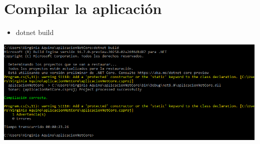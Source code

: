 \section{ Compilar la aplicación } 
\begin{itemize}
    \item dotnet build
\end{itemize}
\begin{center}
\includegraphics[width=\columnwidth]{images/14}\newline
\end{center}
